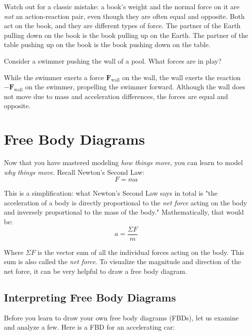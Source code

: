 Watch out for a classic mistake: a book's weight and the normal force on it are \emph{not} an action-reaction pair, even though they are often equal and opposite. Both act on the book, and they are different types of force. The partner of the Earth pulling down on the book is the book pulling up on the Earth. The partner of the table pushing up on the book is the book pushing down on the table.

\begin{Worked}
\begin{Problem}
Consider a swimmer pushing the wall of a pool. What forces are in play?
\end{Problem}
\begin{Solution}
While the swimmer exerts a force \(\mathbf{F}_{\text{wall}}\) on the wall, the wall exerts the reaction \(-\mathbf{F}_{\text{wall}}\) on the swimmer, propelling the swimmer forward.  
Although the wall does not move due to mass and acceleration differences, the forces are equal and opposite. 
\end{Solution}
\end{Worked}


\section{Free Body Diagrams}
Now that you have mastered modeling \textit{how things move}, you can learn to 
model \textit{why things move}. Recall Newton's Second Law:
$$F = ma$$

This is a simplification: what Newton's Second Law says in total is "the 
acceleration of a body is directly proportional to the \textit{net force} 
acting on the body and inversely proportional to the mass of the body." 
Mathematically, that would be:
$$a = \frac{\Sigma F}{m}$$

Where $\Sigma F$ is the vector sum of all the individual forces acting on the 
body. This sum is also called the \textit{net force}. To visualize the magnitude 
and direction of the net force, it can be very helpful to draw a free body
diagram. 

\subsection{Interpreting Free Body Diagrams}
Before you learn to draw your own free body diagrams (FBDs), let us examine and 
analyze a few. Here is a FBD for an accelerating car:

\begin{center}
\end{center}

